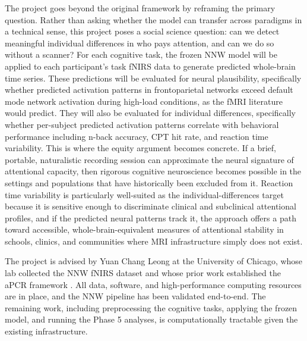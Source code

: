 The project goes beyond the original \textcite{gao2025} framework by reframing the
primary question. Rather than asking whether the model can transfer across paradigms in
a technical sense, this project poses a social science question: can we detect meaningful
individual differences in who pays attention, and can we do so without a scanner? For
each cognitive task, the frozen NNW model will be applied to each participant's task
fNIRS data to generate predicted whole-brain time series. These predictions will be
evaluated for neural plausibility, specifically whether predicted activation patterns in
frontoparietal networks exceed default mode network activation during high-load
conditions, as the fMRI literature would predict. They will also be evaluated for
individual differences, specifically whether per-subject predicted activation patterns
correlate with behavioral performance including n-back accuracy, CPT hit rate, and
reaction time variability. This is where the equity argument becomes concrete. If a
brief, portable, naturalistic recording session can approximate the neural signature of
attentional capacity, then rigorous cognitive neuroscience becomes possible in the
settings and populations that have historically been excluded from it. Reaction time
variability is particularly well-suited as the individual-differences target because it
is sensitive enough to discriminate clinical and subclinical attentional profiles, and if
the predicted neural patterns track it, the approach offers a path toward accessible,
whole-brain-equivalent measures of attentional stability in schools, clinics, and
communities where MRI infrastructure simply does not exist.

The project is advised by Yuan Chang Leong at the University of Chicago, whose lab
collected the NNW fNIRS dataset and whose prior work established the aPCR framework
\parencite{gao2025}. All data, software, and high-performance computing resources are
in place, and the NNW pipeline has been validated end-to-end. The remaining work,
including preprocessing the cognitive tasks, applying the frozen model, and running the
Phase 5 analyses, is computationally tractable given the existing infrastructure.
